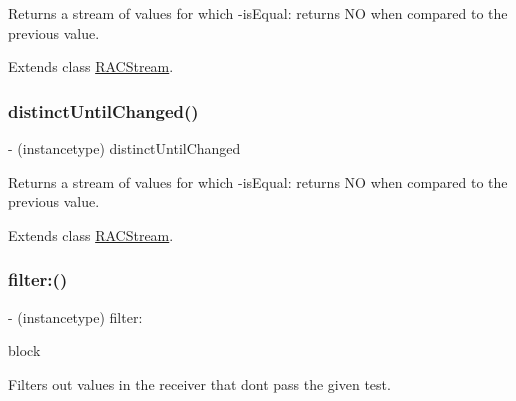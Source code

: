 Returns a stream of values for which -\/is\+Equal\+: returns NO when compared to the previous value. 

Extends class \mbox{\hyperlink{interface_r_a_c_stream_a3af010b929b0c232ddbaa52f574fb888}{R\+A\+C\+Stream}}.

\mbox{\label{category_r_a_c_stream_07_operations_08_a3af010b929b0c232ddbaa52f574fb888}} 
\subsubsection{\texorpdfstring{distinct\+Until\+Changed()}{distinctUntilChanged()}\hspace{0.1cm}{\footnotesize\ttfamily [3/3]}}
{\footnotesize\ttfamily -\/ (instancetype) distinct\+Until\+Changed \begin{DoxyParamCaption}{ }\end{DoxyParamCaption}}

Returns a stream of values for which -\/is\+Equal\+: returns NO when compared to the previous value. 

Extends class \mbox{\hyperlink{interface_r_a_c_stream_a3af010b929b0c232ddbaa52f574fb888}{R\+A\+C\+Stream}}.

\mbox{\label{category_r_a_c_stream_07_operations_08_ae6a990d05708acea33f1c31102f4989b}} 
\subsubsection{\texorpdfstring{filter\+:()}{filter:()}\hspace{0.1cm}{\footnotesize\ttfamily [1/3]}}
{\footnotesize\ttfamily -\/ (instancetype) filter\+: \begin{DoxyParamCaption}\item[{(B\+O\+OL($^\wedge$)(id value))}]{block }\end{DoxyParamCaption}}

Filters out values in the receiver that don\textquotesingle{}t pass the given test.


